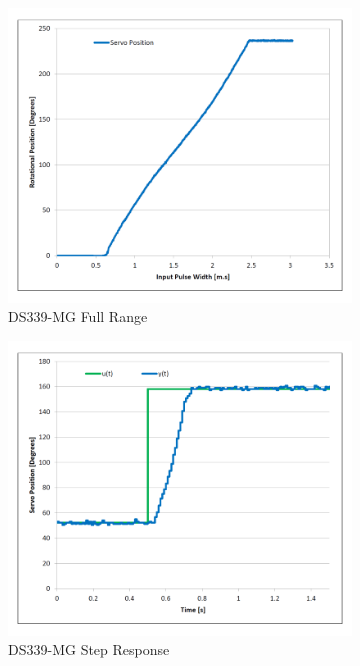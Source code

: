 \begin{figure}[htbp]
\centering
\begin{subfigure}{0.49\textwidth}
\centering
\includegraphics[width=\textwidth]{graphs/servo-range}
\caption{DS339-MG Full Range}
\label{fig:servo-range}
\end{subfigure}
\begin{subfigure}{0.49\textwidth}
\centering
\includegraphics[width=\textwidth]{graphs/servo-step}
\caption{DS339-MG Step Response}
\label{fig:servo-step}
\end{subfigure}
\caption{}
\label{fig:servo-no-load}
\end{figure}
